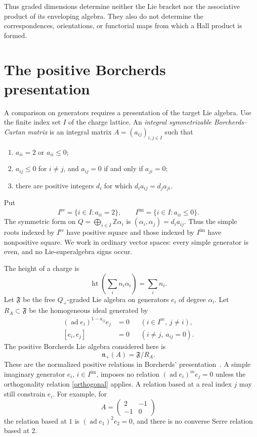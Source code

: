\documentclass[11pt]{article}
\newcommand{\htop}{\operatorname{ht}}
\newcommand{\Ire}{I^{\mathrm{re}}}
\newcommand{\Iim}{I^{\mathrm{im}}}
\begin{document}
Thus graded dimensions determine neither the Lie bracket nor the
associative product of its enveloping algebra.  They also do not determine
the correspondences, orientations, or functorial maps from which a Hall
product is formed.

\section{The positive Borcherds presentation}

A comparison on generators requires a presentation of the target
Lie algebra. Use the finite index set $I$ of the charge lattice.
An \emph{integral symmetrizable
Borcherds--Cartan matrix} is an integral matrix
$A=(a_{ij})_{i,j\in I}$ such that
\begin{enumerate}
\item $a_{ii}=2$ or $a_{ii}\leq0$;
\item $a_{ij}\leq0$ for $i\neq j$, and $a_{ij}=0$ if and only if
      $a_{ji}=0$;
\item there are positive integers $d_i$ for which
      $d_i a_{ij}=d_j a_{ji}$.
\end{enumerate}
Put
\[
 \Ire=\{i\in I:a_{ii}=2\},\qquad
 \Iim=\{i\in I:a_{ii}\leq0\}.
\]
The symmetric form on
$Q=\bigoplus_{i\in I}\mathbb Z\alpha_i$ is
$(\alpha_i,\alpha_j)=d_i a_{ij}$.  Thus the simple roots indexed by
$\Ire$ have positive square and those indexed by $\Iim$ have nonpositive
square.  We work in ordinary vector spaces: every simple generator is even,
and no Lie-superalgebra signs occur.

The height of a charge is
\[
 \htop\left(\sum_i n_i\alpha_i\right)=\sum_i n_i.
\]
Let $\mathfrak F$ be the free $Q_+$-graded Lie algebra on generators $e_i$
of degree $\alpha_i$.  Let $R_A\subset\mathfrak F$ be the homogeneous ideal
generated by
\begin{align}
 (\operatorname{ad}e_i)^{1-a_{ij}}e_j&=0
 &&(i\in\Ire,\ j\neq i),                                    \label{serre}\\
 [e_i,e_j]&=0
 &&(i\neq j,\ a_{ij}=0).                                    \label{orthogonal}
\end{align}
The positive Borcherds Lie algebra considered here is
\[
 \mathfrak n_+(A)=\mathfrak F/R_A.
\]
These are the normalized positive relations in Borcherds'
presentation~\cite[\S1]{Borcherds1988}.  A simple imaginary generator
$e_i$, $i\in\Iim$, imposes no relation
$(\operatorname{ad}e_i)^m e_j=0$ unless the orthogonality relation
\eqref{orthogonal} applies.  A relation based at a real index $j$ may still
constrain $e_i$.  For example, for
\[
 A=\begin{pmatrix}2&-1\\-1&0\end{pmatrix}
\]
the relation based at $1$ is
$(\operatorname{ad}e_1)^2e_2=0$, and there is no converse Serre relation
based at $2$.
\end{document}
